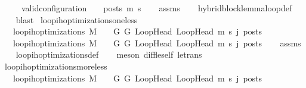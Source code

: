\begin{isabellebody}
\ \ \ \ \ {\isachardoublequoteopen}valid{\isacharunderscore}{\kern0pt}configuration\ {\isasymLambda}\ {\isasymGamma}\ {\isasymOmega}\ posts\ m{\isacharprime}{\kern0pt}\ s{\isacharprime}{\kern0pt}{\isachardoublequoteclose}\isanewline
%
\isadelimproof
\ \ %
\endisadelimproof
%
\isatagproof
{}\isamarkupfalse%
\ assms\isanewline
\ \ \isamarkupfalse%
\ hybrid{\isacharunderscore}{\kern0pt}block{\isacharunderscore}{\kern0pt}lemma{\isacharunderscore}{\kern0pt}loop{\isacharunderscore}{\kern0pt}def\isanewline
\ \ \isamarkupfalse%
\ blast%
\endisatagproof
{\isafoldproof}%
%
\isadelimproof
\isanewline
%
\endisadelimproof
\isanewline
{}\isamarkupfalse%
\ loop{\isacharunderscore}{\kern0pt}ih{\isacharunderscore}{\kern0pt}optimizations{\isacharunderscore}{\kern0pt}one{\isacharunderscore}{\kern0pt}less{\isacharcolon}{\kern0pt}\isanewline
\ \ \ {\isachardoublequoteopen}loop{\isacharunderscore}{\kern0pt}ih{\isacharunderscore}{\kern0pt}optimizations\ M\ {\isasymLambda}\ {\isasymGamma}\ {\isasymOmega}\ G\ G{\isacharprime}{\kern0pt}\ LoopHead\ LoopHead{\isacharprime}{\kern0pt}\ m{\isacharprime}{\kern0pt}\ s{\isacharprime}{\kern0pt}\ j\ posts{\isachardoublequoteclose}\isanewline
\ \ \ {\isachardoublequoteopen}loop{\isacharunderscore}{\kern0pt}ih{\isacharunderscore}{\kern0pt}optimizations\ M\ {\isasymLambda}\ {\isasymGamma}\ {\isasymOmega}\ G\ G{\isacharprime}{\kern0pt}\ LoopHead\ LoopHead{\isacharprime}{\kern0pt}\ m{\isacharprime}{\kern0pt}\ s{\isacharprime}{\kern0pt}\ {\isacharparenleft}{\kern0pt}j{\isacharminus}{\kern0pt}{}{\isacharparenright}{\kern0pt}\ posts{\isachardoublequoteclose}\isanewline
%
\isadelimproof
\ \ %
\endisadelimproof
%
\isatagproof
{}\isamarkupfalse%
\ assms\isanewline
\ \ \isamarkupfalse%
\ loop{\isacharunderscore}{\kern0pt}ih{\isacharunderscore}{\kern0pt}optimizations{\isacharunderscore}{\kern0pt}def\isanewline
\ \ \isamarkupfalse%
\ {\isacharparenleft}{\kern0pt}meson\ diff{\isacharunderscore}{\kern0pt}le{\isacharunderscore}{\kern0pt}self\ le{\isacharunderscore}{\kern0pt}trans{\isacharparenright}{\kern0pt}%
\endisatagproof
{\isafoldproof}%
%
\isadelimproof
\isanewline
%
\endisadelimproof
\isanewline
{}\isamarkupfalse%
\ loop{\isacharunderscore}{\kern0pt}ih{\isacharunderscore}{\kern0pt}optimizations{\isacharunderscore}{\kern0pt}more{\isacharunderscore}{\kern0pt}less{\isacharcolon}{\kern0pt}\isanewline
\ \ \ {\isachardoublequoteopen}loop{\isacharunderscore}{\kern0pt}ih{\isacharunderscore}{\kern0pt}optimizations\ M\ {\isasymLambda}\ {\isasymGamma}\ {\isasymOmega}\ G\ G{\isacharprime}{\kern0pt}\ LoopHead\ LoopHead{\isacharprime}{\kern0pt}\ m{\isacharprime}{\kern0pt}\ s{\isacharprime}{\kern0pt}\ j\ posts{\isachardoublequoteclose}\ \isanewline

\end{isabellebody}
